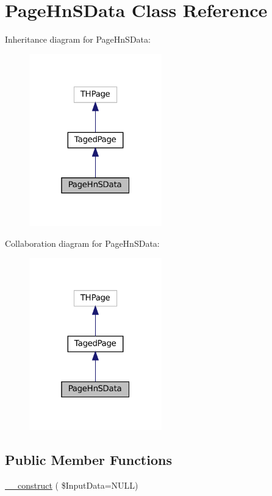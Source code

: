 \hypertarget{class_page_hn_s_data}{}\section{Page\+Hn\+S\+Data Class Reference}
\label{class_page_hn_s_data}


Inheritance diagram for Page\+Hn\+S\+Data\+:\nopagebreak
\begin{figure}[H]
\begin{center}
\leavevmode
\includegraphics[width=163pt]{class_page_hn_s_data__inherit__graph}
\end{center}
\end{figure}


Collaboration diagram for Page\+Hn\+S\+Data\+:\nopagebreak
\begin{figure}[H]
\begin{center}
\leavevmode
\includegraphics[width=163pt]{class_page_hn_s_data__coll__graph}
\end{center}
\end{figure}
\subsection*{Public Member Functions}
\begin{DoxyCompactItemize}
\item 
\hyperlink{class_page_hn_s_data_a55512991b31d1cacb3448fbfed9e8d2b}{\+\_\+\+\_\+construct} ( \$Input\+Data=N\+U\+LL)
\end{DoxyCompactItemize}
